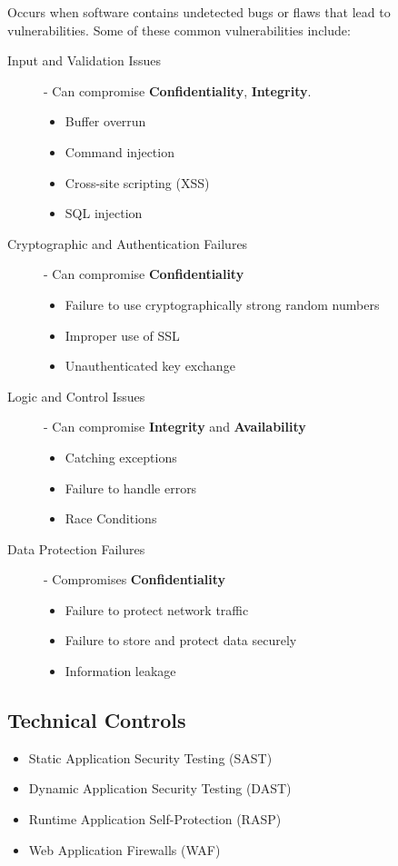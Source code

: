 \documentclass[12pt letter]{report}
\begin{document}
Occurs when software contains undetected bugs or flaws that lead to
vulnerabilities. Some of these common vulnerabilities include:
\begin{description}
  \item[Input and Validation Issues] - Can compromise \textbf{Confidentiality},
    \textbf{Integrity}.
    \begin{itemize}
      \item Buffer overrun
      \item Command injection
      \item Cross-site scripting (XSS)
      \item SQL injection
    \end{itemize}
  \item[Cryptographic and Authentication Failures] - Can compromise
    \textbf{Confidentiality}
    \begin{itemize}
      \item Failure to use cryptographically strong random numbers
      \item Improper use of SSL
      \item Unauthenticated key exchange
    \end{itemize}
  \item[Logic and Control Issues] - Can compromise \textbf{Integrity} and
    \textbf{Availability}
    \begin{itemize}
      \item Catching exceptions
      \item Failure to handle errors
      \item Race Conditions
    \end{itemize}
  \item[Data Protection Failures] - Compromises \textbf{Confidentiality}
    \begin{itemize}
      \item Failure to protect network traffic
      \item Failure to store and protect data securely
      \item  Information leakage
    \end{itemize}
\end{description}

\subsection{Technical Controls}
\begin{itemize}
  \item Static Application Security Testing (SAST)
  \item Dynamic Application Security Testing (DAST)
  \item Runtime Application Self-Protection (RASP)
  \item Web Application Firewalls (WAF)
\end{itemize}
\end{document}
